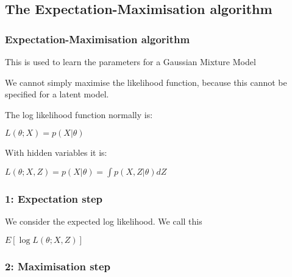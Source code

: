 
\subsection{The Expectation-Maximisation algorithm}

\subsubsection{Expectation-Maximisation algorithm}

This is used to learn the parameters for a Gaussian Mixture Model

We cannot simply maximise the likelihood function, because this cannot be specified for a latent model.

The log likelihood function normally is:

\(L(\theta ; X)=p(X|\theta )\)

With hidden variables it is:

\(L(\theta ; X, Z)=p(X|\theta )=\int p(X, Z|\theta)dZ\)

\subsubsection{1: Expectation step}

We consider the expected log likelihood. We call this 

\(E[\log L(\theta ; X, Z)]\)

\subsubsection{2: Maximisation step}


